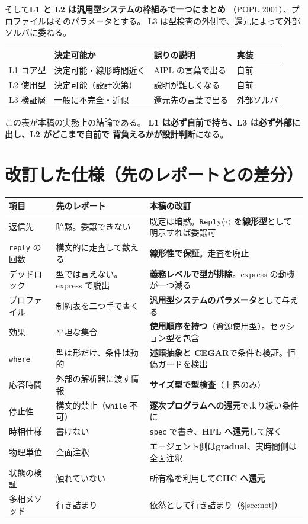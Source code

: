 \documentclass[11pt,a4paper]{ltjsarticle}
\theoremstyle{remark}
\newcommand{\ty}[1]{\ensuremath{\mathtt{#1}}}
\begin{document}
そして\textbf{L1 と L2 は汎用型システムの枠組みで一つにまとめ}
（POPL 2001）、プロファイルはそのパラメータとする。
L3 は型検査の外側で、還元によって外部ソルバに委ねる。

\begin{center}
\small
\begin{tabular}{@{}llll@{}}
\toprule
 & 決定可能か & 誤りの説明 & 実装 \\
\midrule
L1 コア型 & 決定可能・線形時間近く & AIPL の言葉で出る & 自前 \\
L2 使用型 & 決定可能（設計次第） & 説明が難しくなる & 自前 \\
L3 検証層 & 一般に不完全・近似 & 還元先の言葉で出る & 外部ソルバ \\
\bottomrule
\end{tabular}
\end{center}

この表が本稿の実務上の結論である。
\textbf{L1 は必ず自前で持ち、L3 は必ず外部に出し、L2 がどこまで自前で
背負えるかが設計判断}になる。

\section{改訂した仕様（先のレポートとの差分）}

\begin{center}
\small
\begin{longtable}{@{}lp{4.3cm}p{5.0cm}@{}}
\toprule
項目 & 先のレポート & 本稿の改訂 \\
\midrule
\endhead
返信先 & 暗黙。委譲できない &
  既定は暗黙。\ty{Reply}$\langle\tau\rangle$ を\textbf{線形型}として
  明示すれば委譲可 \\
\texttt{reply} の回数 & 構文的に走査して数える &
  \textbf{線形性で保証}。走査を廃止 \\
デッドロック & 型では言えない。express で脱出 &
  \textbf{義務レベルで型が排除}。express の動機が一つ減る \\
プロファイル & 制約表を二つ手で書く &
  \textbf{汎用型システムのパラメータ}として与える \\
効果 & 平坦な集合 &
  \textbf{使用順序を持つ}（資源使用型）。セッション型を包含 \\
\texttt{where} & 型は形だけ、条件は動的 &
  \textbf{述語抽象と CEGAR}で条件も検証。恒偽ガードを検出 \\
応答時間 & 外部の解析器に渡す情報 &
  \textbf{サイズ型で型検査}（上界のみ） \\
停止性 & 構文的禁止（\texttt{while} 不可）&
  \textbf{逐次プログラムへの還元}でより緩い条件に \\
時相仕様 & 書けない &
  \texttt{spec} で書き、\textbf{HFL へ還元}して解く \\
物理単位 & 全面注釈 &
  エージェント側は\textbf{gradual}、実時間側は全面注釈 \\
状態の検証 & 触れていない &
  所有権を利用して\textbf{CHC へ還元} \\
多相メソッド & 行き詰まり &
  依然として行き詰まり（\S\ref{sec:not}）\\
\bottomrule
\end{longtable}
\end{center}
\end{document}
